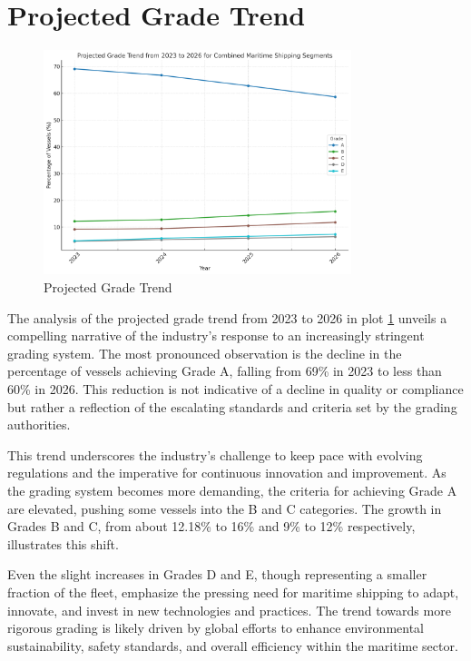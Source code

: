 \section{Projected Grade Trend}

\begin{figure}[h]
    \centering
    \includegraphics[width=0.8\textwidth]{images/grade_trend.png}
    \caption{Projected Grade Trend}
    \label{grade_trend}
\end{figure}

The analysis of the projected grade trend from 2023 to 2026 in plot \ref{grade_trend} unveils a compelling narrative of the industry's response to an increasingly stringent grading system. 
The most pronounced observation is the decline in the percentage of vessels achieving Grade A, falling from 69\% in 2023 to less than 60\% in 2026. 
This reduction is not indicative of a decline in quality or compliance but rather a reflection of the escalating standards and criteria set by the grading authorities.

This trend underscores the industry's challenge to keep pace with evolving regulations and the imperative for continuous innovation and improvement. 
As the grading system becomes more demanding, the criteria for achieving Grade A are elevated, pushing some vessels into the B and C categories. 
The growth in Grades B and C, from about 12.18\% to 16\% and 9\% to 12\% respectively, illustrates this shift.

Even the slight increases in Grades D and E, though representing a smaller fraction of the fleet, emphasize the pressing need for maritime shipping to adapt, innovate, and invest in new technologies and practices. 
The trend towards more rigorous grading is likely driven by global efforts to enhance environmental sustainability, safety standards, and overall efficiency within the maritime sector.

